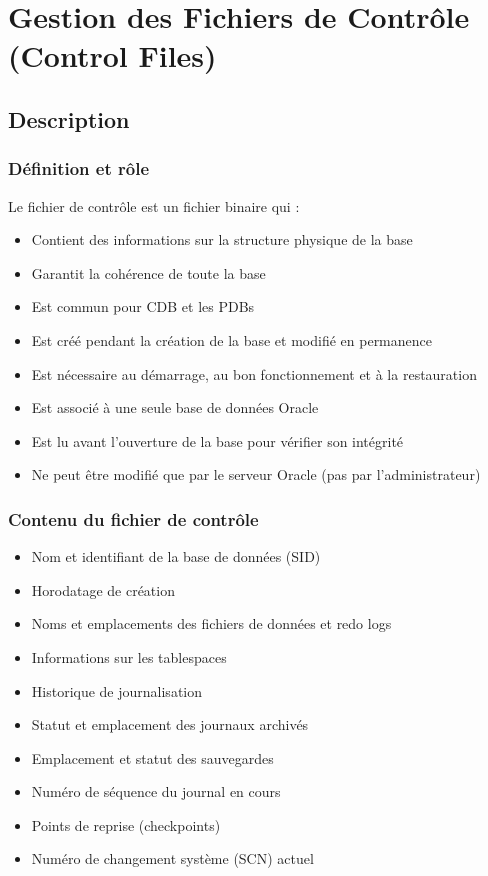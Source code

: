 \documentclass[12pt,a4paper]{article}
\begin{document}
\section{Gestion des Fichiers de Contrôle (Control Files)}

\subsection{Description}

\subsubsection{Définition et rôle}

Le fichier de contrôle est un fichier binaire qui :
\begin{itemize}
    \item Contient des informations sur la structure physique de la base
    \item Garantit la cohérence de toute la base
    \item Est commun pour CDB et les PDBs
    \item Est créé pendant la création de la base et modifié en permanence
    \item Est nécessaire au démarrage, au bon fonctionnement et à la restauration
    \item Est associé à une seule base de données Oracle
    \item Est lu avant l'ouverture de la base pour vérifier son intégrité
    \item Ne peut être modifié que par le serveur Oracle (pas par l'administrateur)
\end{itemize}

\subsubsection{Contenu du fichier de contrôle}

\begin{itemize}
    \item Nom et identifiant de la base de données (SID)
    \item Horodatage de création
    \item Noms et emplacements des fichiers de données et redo logs
    \item Informations sur les tablespaces
    \item Historique de journalisation
    \item Statut et emplacement des journaux archivés
    \item Emplacement et statut des sauvegardes
    \item Numéro de séquence du journal en cours
    \item Points de reprise (checkpoints)
    \item Numéro de changement système (SCN) actuel
\end{itemize}
\end{document}
